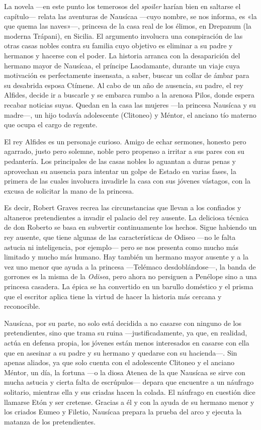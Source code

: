 La novela ---en este punto los temerosos del \emph{spoiler} harían bien en saltarse el capítulo--- relata las aventuras de Nausícaa ---cuyo nombre, se nos informa, es «la que quema las naves»---, princesa de la casa real de los élimos, en
Drepanum (la moderna Trápani), en Sicilia. El argumento involucra una conspiración de las otras casas nobles contra su familia cuyo objetivo es eliminar a su padre y hermanos y hacerse con el poder. La historia arranca con la desaparición del hermano mayor de Nausícaa, el príncipe Laodamante, durante un viaje cuya motivación es perfectamente insensata, a saber, buscar un collar de ámbar para su desabrida esposa Ctímene. Al cabo de un año de ausencia, su padre, el rey Alfides, decide ir a buscarle y se embarca rumbo a la arenosa Pilos, donde espera recabar noticias suyas. Quedan en la casa las mujeres ---la princesa Nausícaa y su madre---, un hijo todavía adolescente (Clitoneo) y Méntor, el anciano tío materno que ocupa el cargo de regente.

El rey Alfides es un personaje curioso. Amigo de echar sermones, honesto pero agarrado, justo pero solemne, noble pero propenso a irritar a sus pares con su pedantería. Los principales de las casas nobles lo aguantan a duras penas y aprovechan su ausencia para intentar un golpe de Estado en varias fases, la primera de las cuales involucra invadirle la casa con sus jóvenes vástagos, con la excusa de solicitar la mano de la princesa.

Es decir, Robert Graves recrea las circunstancias que llevan a los confiados y altaneros pretendientes a invadir el palacio del rey ausente. La deliciosa técnica de don Roberto se basa en subvertir continuamente los hechos. Sigue habiendo un rey ausente, que tiene algunas de las características de Odiseo ---no le falta astucia ni inteligencia, por ejemplo--- pero se nos presenta como mucho más limitado y mucho más humano. Hay también un hermano mayor ausente y a la vez uno menor que ayuda a la princesa ---Telémaco desdoblándose---, la banda de gorrones es la misma de la \emph{Odisea}, pero ahora no persiguen a Penélope sino a una princesa casadera. La épica se ha convertido en un barullo doméstico y el prisma que el escritor aplica tiene la virtud de hacer la historia más cercana y reconocible.

Nausícaa, por su parte, no solo está decidida a no casarse con ninguno de los pretendientes, sino que trama su ruina ---justificadamente, ya que, en realidad, actúa en defensa propia, los jóvenes están menos interesados en casarse con ella que en asesinar a su padre y su hermano y quedarse con su hacienda---. Sin apenas aliados, ya que solo cuenta con el adolescente Clitoneo y el anciano Méntor, un día, la fortuna ---o la diosa Atenea de la que Nausícaa se sirve con mucha astucia y cierta falta de escrúpulos--- depara que encuentre a un náufrago solitario, mientras ella y sus criadas hacen la colada. El náufrago en cuestión dice llamarse Etón y ser cretense. Gracias a él y con la ayuda de su hermano menor y los criados Eumeo y Filetio, Nausícaa prepara la prueba del arco y ejecuta la matanza de los pretendientes.


